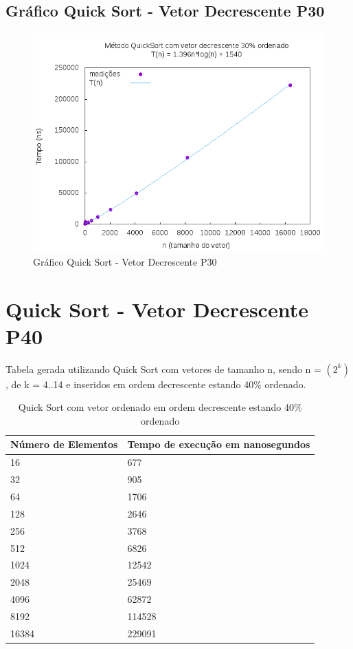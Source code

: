 \documentclass[12pt,a4paper,twoside]{report}
\begin{document}
\subsection{Gráfico Quick Sort - Vetor Decrescente P30}
\begin{figure}[H]
    \centering
    \includegraphics[width=0.7\linewidth]{graficos/QuickSort/vIntDecrescenteP30/vIntDecrescenteP30.png}
  \caption{Gráfico Quick Sort - Vetor Decrescente P30}
\end{figure}

\section{Quick Sort - Vetor Decrescente P40}
Tabela gerada utilizando Quick Sort com vetores de tamanho n, sendo n = $(2^k)$, de k = 4..14 e inseridos em ordem decrescente estando 40\% ordenado.
\begin{table}[H]
\centering
\caption{Quick Sort com vetor ordenado em ordem decrescente estando 40\% ordenado}
\label{my-label}
\begin{tabular}{|l|l|}
\hline
\multicolumn{1}{|c|}{\textbf{Número de Elementos}} & \multicolumn{1}{c|}{\textbf{Tempo de execução em nanosegundos}} \\ \hline
16 & 677 \\ \hline
32 & 905 \\ \hline
64 & 1706 \\ \hline
128 & 2646 \\ \hline
256 & 3768 \\ \hline
512 & 6826 \\ \hline
1024 & 12542 \\ \hline
2048 & 25469 \\ \hline
4096 & 62872 \\ \hline
8192 & 114528 \\ \hline
16384 & 229091 \\ \hline
\end{tabular}
\end{table}
\end{document}
